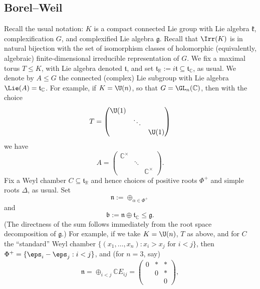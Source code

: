 \documentclass[reqno]{amsart} 
\begin{document}
\subsection{Borel--Weil}
\label{sec:borel-weil}
Recall the usual notation: $K$ is a compact connected Lie group with Lie algebra $\mathfrak{k}$, complexification $G$, and complexified Lie algebra $\mathfrak{g}$.  Recall that $\Irr(K)$ is in natural bijection with the set of isomorphism classes of holomorphic (equivalently, algebraic) finite-dimensional irreducible representation of $G$.  We fix a maximal torus $T \leq K$, with Lie algebra denoted $\mathfrak{t}$, and set $\mathfrak{t}_{\mathbb{R}} := i \mathfrak{t} \subseteq \mathfrak{t} _{\mathbb{C}}$, as usual.  We denote by $A \leq G$ the connected (complex) Lie subgroup with Lie algebra $\Lie(A) = \mathfrak{t}_{\mathbb{C}}$.  For example, if $K = \U(n)$, so that $G = \GL_n(\mathbb{C})$, then with the choice
\begin{equation*}
  T = 
\begin{pmatrix}
    \U(1) &  &  \\
    & \ddots &  \\
    & & \U(1)
  \end{pmatrix}
\end{equation*}
we have
\begin{equation*}
  A = 
\begin{pmatrix}
    \mathbb{C}^\times &  &  \\
    & \ddots &  \\
    & & \mathbb{C}^\times
  \end{pmatrix}
.
\end{equation*}
Fix a Weyl chamber $C \subseteq \mathfrak{t}_{\mathbb{R}}$ and hence choices of positive roots $\Phi^+$ and simple roots $\Delta$, as usual.  Set
\begin{equation*}
  \mathfrak{n} := \oplus_{\alpha \in \Phi^+}
\end{equation*}
and
\begin{equation*}
  \mathfrak{b} := \mathfrak{n} \oplus \mathfrak{t}_{\mathbb{C}} \leq \mathfrak{g}.
\end{equation*}
(The directness of the sum follows immediately from the root space decomposition of $\mathfrak{g}$.)  For example, if we take $K = \U(n)$, $T$ as above, and for $C$ the ``standard'' Weyl chamber $\{(x_1,\dotsc,x_n) : x_i > x_j \text{ for } i < j \}$, then $\Phi^+ = \{\eps_i - \eps_j : i < j\}$, and (for $n=3$, say)
\begin{equation*}
  \mathfrak{n} = \oplus_{i < j} \mathbb{C} E_{i j } = 
\begin{pmatrix}
    0 & \ast & \ast \\
    & 0 & \ast \\
    & & 0
  \end{pmatrix}
,
\end{equation*}
\end{document}
